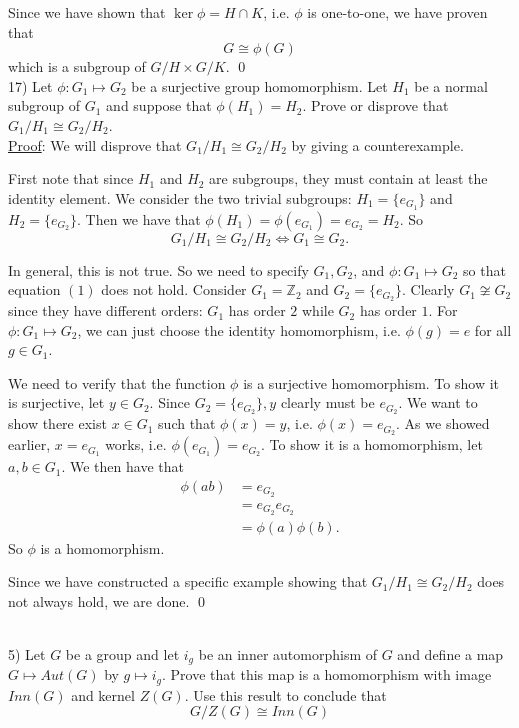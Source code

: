 \documentclass{article}
\begin{document}
Since we have shown that $\ker \phi = H \cap K$, i.e. $\phi$ is one-to-one, we have proven that 
$$G \cong \phi(G)$$
which is a subgroup of $G/H \times G/K$. \qed \\

17) Let $\phi : G_1 \mapsto G_2$ be a surjective group homomorphism. Let $H_1$ be a normal subgroup of $G_1$ and suppose that $\phi(H_1) = H_2$. Prove or disprove that $G_1/H_1 \cong G_2/H_2$. \\

\underline{Proof}: We will disprove that $G_1/H_1 \cong G_2/H_2$ by giving a counterexample.

First note that since $H_1$ and $H_2$ are subgroups, they must contain at least the identity element. We consider the two trivial subgroups: $H_1 = \{ e_{G_1} \}$ and $H_2 = \{ e_{G_2} \}$. Then we have that $\phi(H_1) = \phi(e_{G_1}) = e_{G_2} = H_2$. So
\begin{equation}
	G_1/H_1 \cong G_2/H_2 \iff G_1 \cong G_2.
\end{equation}

In general, this is not true. So we need to specify $G_1, G_2$, and $\phi : G_1 \mapsto G_2$ so that equation $(1)$ does not hold. Consider $G_1 = \mathbb{Z}_{2}$ and $G_2 = \{e_{G_2}\}$. Clearly $G_1 \not \cong G_2$ since they have different orders: $G_1$ has order $2$ while $G_2$ has order $1$. For $\phi : G_1 \mapsto G_2$, we can just choose the identity homomorphism, i.e. $\phi(g) = e$ for all $g \in G_1$.

We need to verify that the function $\phi$ is a surjective homomorphism. To show it is surjective, let $y \in G_2$. Since $G_2 = \{e_{G_2}\}, y$ clearly must be $e_{G_2}$. We want to show there exist $x \in G_1$ such that $\phi(x) = y$, i.e. $\phi(x) = e_{G_2}$. As we showed earlier, $x = e_{G_1}$ works, i.e. $\phi(e_{G_1}) = e_{G_2}$. To show it is a homomorphism, let $a, b \in G_1$. We then have that
\begin{align*}
	\phi(ab) &= e_{G_2} \\
	&= e_{G_2} e_{G_2} \\
	&= \phi(a)\phi(b).
\end{align*}
So $\phi$ is a homomorphism.

Since we have constructed a specific example showing that $G_1/H_1 \cong G_2/H_2$ does not always hold, we are done. \qed \\\

5) Let $G$ be a group and let $i_g$ be an inner automorphism of $G$ and define a map $G \mapsto Aut(G)$ by $g \mapsto i_g$. Prove that this map is a homomorphism with image $Inn(G)$ and kernel $Z(G)$. Use this result to conclude that 
$$G/Z(G) \cong Inn(G)$$
\end{document}
